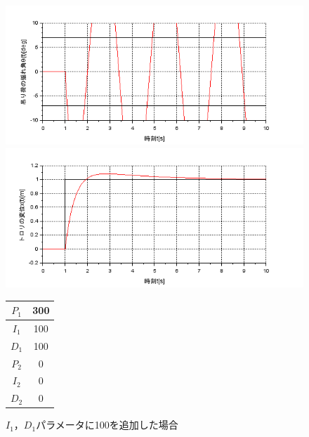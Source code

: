 \documentclass[dvipdfmx,titlepage,a4j]{jsarticle}  %
\begin{document}
\begin{figure}[H]
  \begin{minipage}{4.5cm}
    \centering
    \includegraphics[keepaspectratio, scale=0.35]{../graph/crane/ang-P1-300-I1-100-D1-0-P2-0-I2-0-D2-0.png}
  \end{minipage}
  \hfill
  \begin{minipage}{4.5cm}
    \centering
    \includegraphics[keepaspectratio, scale=0.35]{../graph/crane/po-P1-300-I1-100-D1-0-P2-0-I2-0-D2-0.png}
  \end{minipage}
  \hfill
  \begin{minipage}{3cm}
    \begin{center}
      \begin{tabular}{c|c}
        \hline
        $P_1$ & 300\\ \hline
        $I_1$ & 100\\ \hline
        $D_1$ & 100\\ \hline
        $P_2$ & 0\\ \hline
        $I_2$ & 0\\ \hline
        $D_2$ & 0\\
        \hline
      \end{tabular}
    \end{center}
  \end{minipage}
  \hfill
  \caption{$I_1$，$D_1$パラメータに100を追加した場合}
  \label{fig:crane:6}
\end{figure}
\end{document}
